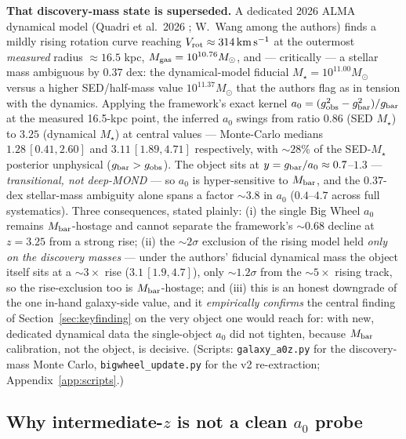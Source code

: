 \documentclass[11pt,a4paper]{article}
\newcommand{\Mbar}{M_{\rm bar}}
\newcommand{\azero}{a_0}
\begin{document}
\textbf{That discovery-mass state is superseded.} A dedicated 2026 ALMA
dynamical model (Quadri et al.\ 2026 \cite{Quadri2026}; W.~Wang among the
authors) finds a mildly rising rotation curve reaching
$V_{\rm rot}\approx314\,{\rm km\,s^{-1}}$ at the outermost \emph{measured}
radius $\approx16.5$ kpc, $M_{\rm gas}=10^{10.76}M_\odot$, and --- critically
--- a stellar mass ambiguous by $0.37$ dex: the dynamical-model fiducial
$M_\star=10^{11.00}M_\odot$ versus a higher SED/half-mass value
$10^{11.37}M_\odot$ that the authors flag as in tension with the dynamics.
Applying the framework's exact kernel
$\azero=(g_{\rm obs}^2-g_{\rm bar}^2)/g_{\rm bar}$ at the measured 16.5-kpc
point, the inferred $\azero$ swings from ratio $0.86$ (SED $M_\star$) to
$3.25$ (dynamical $M_\star$) at central values --- Monte-Carlo medians
$1.28\,[0.41,2.60]$ and $3.11\,[1.89,4.71]$ respectively, with $\sim28\%$ of
the SED-$M_\star$ posterior unphysical ($g_{\rm bar}>g_{\rm obs}$). The object
sits at $y=g_{\rm bar}/\azero\approx0.7$--$1.3$ --- \emph{transitional, not
deep-MOND} --- so $\azero$ is hyper-sensitive to $\Mbar$, and the $0.37$-dex
stellar-mass ambiguity alone spans a factor $\sim3.8$ in $\azero$ ($0.4$--$4.7$
across full systematics). Three consequences, stated plainly:
(i) the single Big Wheel $\azero$ remains $\Mbar$-hostage and cannot separate
the framework's $\sim0.68$ decline at $z=3.25$ from a strong rise;
(ii) the $\sim2\sigma$ exclusion of the rising model held \emph{only on the
discovery masses} --- under the authors' fiducial dynamical mass the object
itself sits at a $\sim3\times$ rise ($3.1\,[1.9,4.7]$), only $\sim1.2\sigma$
from the $\sim5\times$ rising track, so the rise-exclusion too is
$\Mbar$-hostage; and (iii) this is an honest downgrade of the one in-hand
galaxy-side value, and it \emph{empirically confirms} the central finding of
Section~\ref{sec:keyfinding} on the very object one would reach for: with new,
dedicated dynamical data the single-object $\azero$ did not tighten, because
$\Mbar$ calibration, not the object, is decisive. (Scripts:
\texttt{galaxy\_a0z.py} for the discovery-mass Monte Carlo,
\texttt{bigwheel\_update.py} for the v2 re-extraction; Appendix~\ref{app:scripts}.)

\subsection{Why intermediate-$z$ is not a clean $a_0$ probe}
\label{sec:intermediate}
\end{document}
